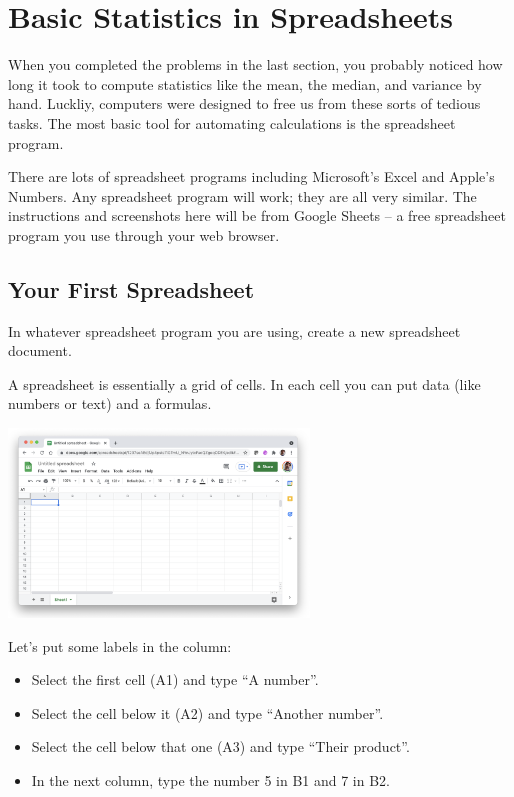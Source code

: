 \chapter{Basic Statistics in Spreadsheets}

When you completed the problems in the last section, you probably noticed
how long it took to compute statistics like the mean, the median,
and variance by hand. Luckliy, computers were designed to free us from these
sorts of tedious tasks. The most basic tool for automating
calculations is the spreadsheet program.

There are lots of spreadsheet programs including Microsoft's Excel and
Apple's Numbers. Any spreadsheet program will work; they are all very
similar. The instructions and screenshots here will be from Google
Sheets -- a free spreadsheet program you use through your web browser.

\section{Your First Spreadsheet}

In whatever spreadsheet program you are using, create a new spreadsheet document.

A spreadsheet is essentially a grid of cells. In each cell you can put data (like numbers or text) and a formulas.

\includegraphics[width=0.6\textwidth]{BlankSheet.png}

Let's put some labels in the column:
\begin{itemize}
\item Select the first cell (A1) and type ``A number''.
\item Select the cell below it (A2) and type ``Another number''.
\item Select the cell below that one (A3) and type ``Their product''.
\item In the next column, type the number 5 in B1 and 7 in B2.
\end{itemize}

